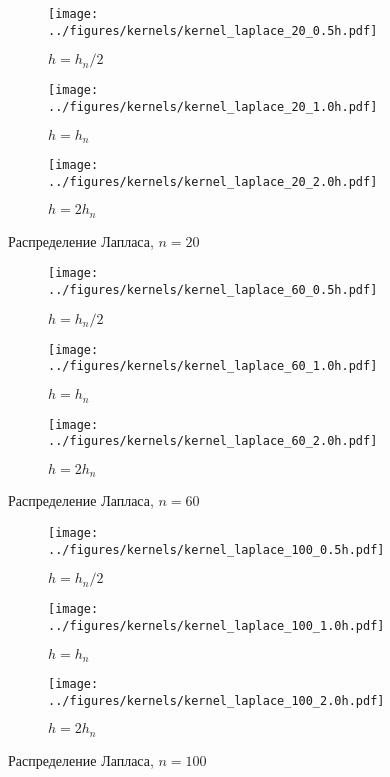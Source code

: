 \documentclass[12pt]{article}
\begin{document}
	\begin{figure}[H]
		\centering
		\begin{subfigure}[t]{.3\linewidth}
			\centering\texttt{[image: ../figures/kernels/kernel\_laplace\_20\_0.5h.pdf]}
			\caption*{$h = h_n/2$}
		\end{subfigure}
		\begin{subfigure}[t]{.3\linewidth}
			\centering\texttt{[image: ../figures/kernels/kernel\_laplace\_20\_1.0h.pdf]}
			\caption*{$h = h_n$}
		\end{subfigure}
		\begin{subfigure}[t]{.3\linewidth}
			\centering\texttt{[image: ../figures/kernels/kernel\_laplace\_20\_2.0h.pdf]}
			\caption*{$h = 2h_n$}
		\end{subfigure}
		\caption{Распределение Лапласа, $n = 20$}
	\end{figure}
	\begin{figure}[H]
		\centering
		\begin{subfigure}[t]{.3\linewidth}
			\centering\texttt{[image: ../figures/kernels/kernel\_laplace\_60\_0.5h.pdf]}
			\caption*{$h = h_n/2$}
		\end{subfigure}
		\begin{subfigure}[t]{.3\linewidth}
			\centering\texttt{[image: ../figures/kernels/kernel\_laplace\_60\_1.0h.pdf]}
			\caption*{$h = h_n$}
		\end{subfigure}
		\begin{subfigure}[t]{.3\linewidth}
			\centering\texttt{[image: ../figures/kernels/kernel\_laplace\_60\_2.0h.pdf]}
			\caption*{$h = 2h_n$}
		\end{subfigure}
		\caption{Распределение Лапласа, $n = 60$}
	\end{figure}
	\begin{figure}[H]
		\centering
		\begin{subfigure}[t]{.3\linewidth}
			\centering\texttt{[image: ../figures/kernels/kernel\_laplace\_100\_0.5h.pdf]}
			\caption*{$h = h_n/2$}
		\end{subfigure}
		\begin{subfigure}[t]{.3\linewidth}
			\centering\texttt{[image: ../figures/kernels/kernel\_laplace\_100\_1.0h.pdf]}
			\caption*{$h = h_n$}
		\end{subfigure}
		\begin{subfigure}[t]{.3\linewidth}
			\centering\texttt{[image: ../figures/kernels/kernel\_laplace\_100\_2.0h.pdf]}
			\caption*{$h = 2h_n$}
		\end{subfigure}
		\caption{Распределение Лапласа, $n = 100$}
	\end{figure}
\end{document}

